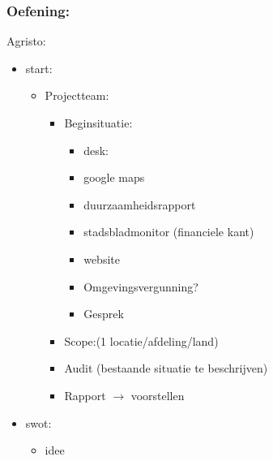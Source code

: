 \documentclass[12pt]{article}
\begin{document}
\subsubsection{Oefening:}
Agristo:\begin{itemize}
    \item start:\begin{itemize}
        \item Projectteam:\begin{itemize}
            \item Beginsituatie:\begin{itemize}
                \item[]desk:
                \item google maps 
                \item duurzaamheidsrapport 
                \item stadsbladmonitor (financiele kant) 
                \item website 
                \item Omgevingsvergunning?
                \item Gesprek
            \end{itemize}
            \item Scope:(1 locatie/afdeling/land)
            \item Audit (bestaande situatie te beschrijven)
            \item Rapport $\rightarrow$ voorstellen
        \end{itemize}
    \end{itemize}
    \item swot:\begin{itemize}
        \item idee
    \end{itemize}
\end{itemize}
\end{document}
